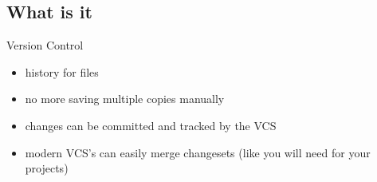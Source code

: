 \documentclass{beamer}
\begin{document}
\subsection{What is it}

\begin{frame}{Version Control}
  \begin{itemize}
    \item history for files
    \item no more saving multiple copies manually
    \item changes can be committed and tracked by the VCS
    \item modern VCS's can easily merge changesets (like you will need for your
      projects)
  \end{itemize}
\end{frame}
\end{document}

